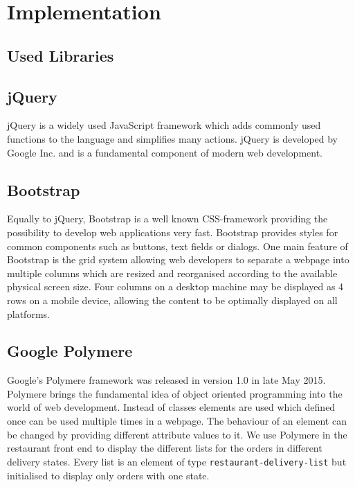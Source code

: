 \section{Implementation}

\subsection{Used Libraries}
\subsection{jQuery}
jQuery is a widely used JavaScript framework which adds commonly used functions to the language and simplifies many actions. jQuery is developed by Google Inc. and is a fundamental component of modern web development.

\subsection{Bootstrap}
Equally to jQuery, Bootstrap is a well known CSS-framework providing the possibility to develop web applications very fast. Bootstrap provides styles for common components such as buttons, text fields or dialogs. One main feature of Bootstrap is the grid system allowing web developers to separate a webpage into multiple columns which are resized and reorganised according to the available physical screen size. Four columns on a desktop machine may be displayed as 4 rows on a mobile device, allowing the content to be optimally displayed on all platforms.

\subsection{Google Polymere}
Google's Polymere framework was released in version 1.0 in late May 2015. Polymere brings the fundamental idea of object oriented programming into the world of web development. Instead of classes elements are used which defined once can be used multiple times in a webpage. The behaviour of an element can be changed by providing different attribute values to it. We use Polymere in the restaurant front end to display the different lists for the orders in different delivery states. Every list is an element of type \texttt{restaurant-delivery-list} but initialised to display only orders with one state.

